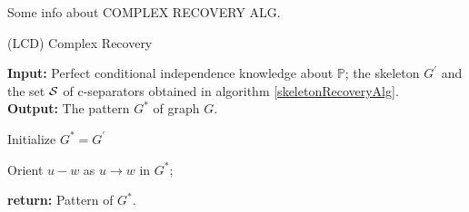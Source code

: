 %
%


Some info about COMPLEX RECOVERY ALG.

\begin{algorithm}
	\caption{(LCD) Complex Recovery}\label{complexRecoveryAlg}
	
	\textbf{Input:} Perfect conditional independence knowledge about $\mathbb{P}$; the skeleton $G^{'}$ and the set 
					$\mathcal{S}$ of c-separators obtained in algorithm \ref{skeletonRecoveryAlg}.  \\
	\textbf{Output:} The pattern $G^{*}$ of graph $G$.

	
	\begin{algorithmic}[1]
			\State Initialize $G^{*} = G^{'}$ 
	
						\State Orient $u - w$ as $u \rightarrow w$ in $G^{*}$;
					\EndIf
				\EndFor
			\EndFor			
			
			\State \textbf{return:} Pattern of $G^{*}$.
		\EndProcedure
	\end{algorithmic}
\end{algorithm}
